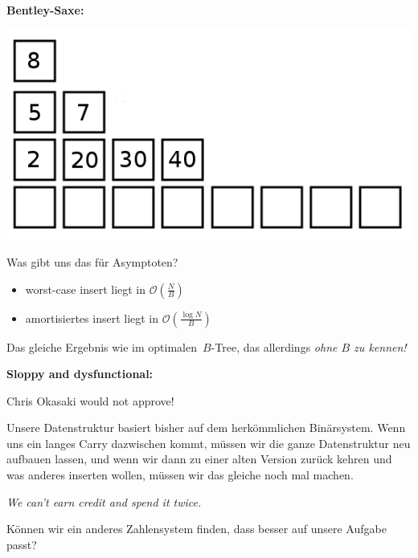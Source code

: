 \documentclass{beamer}
\begin{document}
\begin{frame}
\textbf{Bentley-Saxe:}
\begin{center}
\includegraphics[scale=0.25]{bentley_saxe_05.png} 
\end{center}

Was gibt uns das für Asymptoten?\bigskip

\begin{itemize}
\item worst-case insert liegt in $\mathcal{O}(\frac{N}{B})$\pause
\item amortisiertes insert liegt in $\mathcal{O}(\frac{\log{}N}{B})$\pause
\end{itemize}

Das gleiche Ergebnis wie im \glqq optimalen\grqq\ $B$-Tree, das allerdings \emph{ohne $B$ zu kennen!}
\end{frame}


\begin{frame}
\textbf{Sloppy and dysfunctional:}
\bigskip

Chris Okasaki would not approve!\pause\smallskip

Unsere Datenstruktur basiert bisher auf dem herkömmlichen Binärsystem. Wenn uns ein langes Carry dazwischen kommt, müssen wir die ganze Datenstruktur neu aufbauen lassen, und wenn wir dann zu einer alten Version zurück kehren und was anderes inserten wollen, müssen wir das gleiche noch mal machen.
\smallskip\smallskip\pause

\begin{center}
\emph{\glqq We can't earn credit and spend it twice.\grqq}
\end{center}
\smallskip\smallskip\pause

Können wir ein anderes Zahlensystem finden, dass besser auf unsere Aufgabe passt?
\end{frame}
\end{document}
